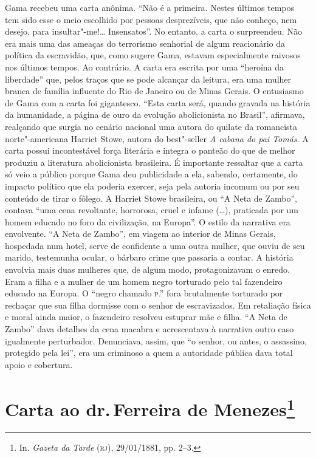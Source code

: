{\small\noindent
Gama recebeu uma carta anônima. ``Não é a primeira. Nestes últimos
tempos tem sido esse o meio escolhido por pessoas desprezíveis, que não
conheço, nem desejo, para insultar"-me!\ldots{} Insensatos''. No entanto, a
carta o surpreendeu. Não era mais uma das ameaças do terrorismo
senhorial de algum reacionário da política da escravidão, que, como
sugere Gama, estavam especialmente raivosos nos últimos tempos. Ao
contrário. A carta era escrita por uma ``heroína da liberdade'' que, pelos
traços que se pode alcançar da leitura, era uma mulher branca de família
influente do Rio de Janeiro ou de Minas Gerais. O entusiasmo de Gama com
a carta foi gigantesco. ``Esta carta será, quando gravada na história da
humanidade, a página de ouro da evolução abolicionista no Brasil'',
afirmava, realçando que surgia no cenário nacional uma autora do quilate
da romancista norte"-americana Harriet Stowe, autora do best"-seller \emph{A
cabana do pai Tomás}. A carta possui incontestável força literária e integra o panteão do que de
melhor produziu a literatura abolicionista brasileira.
É importante ressaltar que a carta só veio a
público porque Gama deu publicidade a ela, sabendo, certamente, do
impacto político que ela poderia exercer, seja pela autoria incomum ou
por seu conteúdo de tirar o fôlego. A Harriet
Stowe brasileira, ou ``A Neta de Zambo'', contava ``uma cena revoltante,
horrorosa, cruel e infame (\ldots{}), praticada por um homem educado no foro
da civilização, na Europa''. O estilo da narrativa era envolvente. ``A
Neta de Zambo'', em viagem ao interior de Minas Gerais, hospedada num
hotel, serve de confidente a uma outra mulher, que ouviu de seu marido,
testemunha ocular, o bárbaro crime que passaria a contar. A história
envolvia mais duas mulheres que, de algum modo, protagonizavam o enredo.
Eram a filha e a mulher de um homem negro torturado pelo tal fazendeiro
educado na Europa. O ``negro chamado \textsc{p}.'' fora brutalmente torturado por
rechaçar que sua filha dormisse com o senhor de escravizados. Em
retaliação física e moral ainda maior, o fazendeiro resolveu estuprar
mãe e filha. ``A Neta de Zambo'' dava detalhes da cena macabra e
acrescentava à narrativa outro caso igualmente perturbador. Denunciava,
assim, que ``o senhor, ou antes, o assassino, protegido pela lei'', era um
criminoso a quem a autoridade pública dava total apoio e cobertura. }

\chapter{Carta ao dr.\,Ferreira de Menezes\footnote[*]{In.
  \emph{Gazeta da Tarde} (\textsc{rj}), 29/01/1881, pp. 2--3.}}


